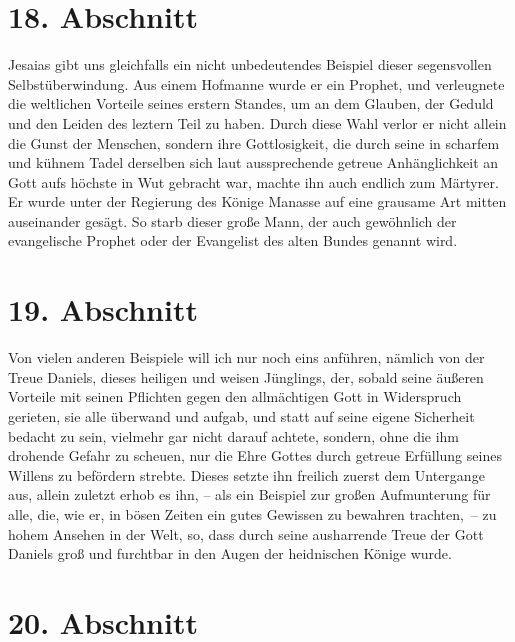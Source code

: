 \section{18. Abschnitt} \label{kap4_ab18}

 Jesaias gibt uns gleichfalls ein nicht unbedeutendes
Beispiel dieser
segensvollen Selbstüberwindung. Aus einem Hofmanne wurde er ein Prophet, und
verleugnete die weltlichen Vorteile seines erstern Standes, um an dem Glauben,
der Geduld und den Leiden des leztern Teil zu haben. Durch diese Wahl verlor er
nicht allein die Gunst der Menschen, sondern ihre Gottlosigkeit, die durch seine
in scharfem und kühnem Tadel derselben sich laut aussprechende getreue
Anhänglichkeit an Gott aufs höchste in Wut gebracht war, machte ihn auch
endlich zum Märtyrer. Er wurde unter der Regierung
des Könige
Manasse auf eine
grausame Art mitten auseinander gesägt. So starb dieser große Mann, der auch
gewöhnlich der evangelische Prophet oder der Evangelist des alten
Bundes genannt wird.

\section{19. Abschnitt} \label{kap4_ab19}

Von vielen anderen Beispiele will ich nur noch eins anführen, nämlich von der
Treue Daniels, dieses heiligen
 und
weisen Jünglings, der, sobald seine äußeren
Vorteile mit seinen Pflichten gegen den allmächtigen Gott in Widerspruch
gerieten, sie alle überwand und aufgab, und statt auf seine eigene
Sicherheit bedacht zu sein, vielmehr gar nicht darauf achtete, sondern, ohne die
ihm drohende Gefahr zu scheuen, nur die Ehre Gottes durch getreue Erfüllung
seines Willens zu befördern strebte. Dieses setzte ihn freilich zuerst dem
Untergange aus, allein zuletzt erhob es ihn, -- als ein Beispiel zur großen
Aufmunterung für alle, die, wie er, in bösen Zeiten ein gutes Gewissen zu
bewahren trachten,~-- zu hohem Ansehen in der Welt, so, dass durch seine
ausharrende Treue der Gott Daniels groß und furchtbar in den Augen der
heidnischen Könige wurde.

\section{20. Abschnitt} \label{kap4_ab20}

